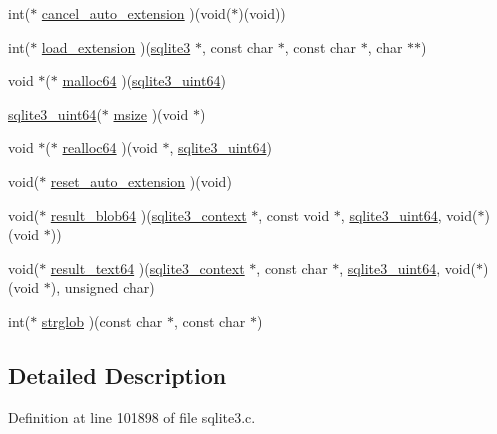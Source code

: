 \begin{DoxyCompactItemize}
\item 
int($\ast$ \hyperlink{structsqlite3__api__routines_a6acef5f8196481f86b71c60619468d23}{cancel\+\_\+auto\+\_\+extension} )(void($\ast$)(void))
\item 
int($\ast$ \hyperlink{structsqlite3__api__routines_ad9234c15dcf607e79e3168a32cf9a611}{load\+\_\+extension} )(\hyperlink{structsqlite3}{sqlite3} $\ast$, const char $\ast$, const char $\ast$, char $\ast$$\ast$)
\item 
void $\ast$($\ast$ \hyperlink{structsqlite3__api__routines_ab8c993d0e3cdaa5f343618be6281ff90}{malloc64} )(\hyperlink{sqlite3_8c_a181c20ecfd72bc6627635746d382c610}{sqlite3\+\_\+uint64})
\item 
\hyperlink{sqlite3_8c_a181c20ecfd72bc6627635746d382c610}{sqlite3\+\_\+uint64}($\ast$ \hyperlink{structsqlite3__api__routines_af1044837dbbd9f43cc04104cdf509787}{msize} )(void $\ast$)
\item 
void $\ast$($\ast$ \hyperlink{structsqlite3__api__routines_a8b1ea7659f5ba58a60afd4c83b012c4a}{realloc64} )(void $\ast$, \hyperlink{sqlite3_8c_a181c20ecfd72bc6627635746d382c610}{sqlite3\+\_\+uint64})
\item 
void($\ast$ \hyperlink{structsqlite3__api__routines_aef8ba7d5f8d6ce8841b86ce43abf48d8}{reset\+\_\+auto\+\_\+extension} )(void)
\item 
void($\ast$ \hyperlink{structsqlite3__api__routines_a240a03a7ab8b6e0b1e124fa9132ba721}{result\+\_\+blob64} )(\hyperlink{structsqlite3__context}{sqlite3\+\_\+context} $\ast$, const void $\ast$, \hyperlink{sqlite3_8c_a181c20ecfd72bc6627635746d382c610}{sqlite3\+\_\+uint64}, void($\ast$)(void $\ast$))
\item 
void($\ast$ \hyperlink{structsqlite3__api__routines_ae7893880dc360bde005efb439340caca}{result\+\_\+text64} )(\hyperlink{structsqlite3__context}{sqlite3\+\_\+context} $\ast$, const char $\ast$, \hyperlink{sqlite3_8c_a181c20ecfd72bc6627635746d382c610}{sqlite3\+\_\+uint64}, void($\ast$)(void $\ast$), unsigned char)
\item 
int($\ast$ \hyperlink{structsqlite3__api__routines_ab57cdd985ed3e28d8fc6a74011b031cc}{strglob} )(const char $\ast$, const char $\ast$)
\end{DoxyCompactItemize}


\subsection{Detailed Description}


Definition at line 101898 of file sqlite3.\+c.



